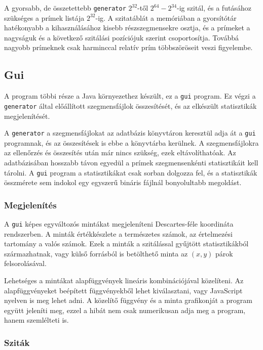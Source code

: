 A gyorsabb, de összetettebb \texttt{generator} $2^{32}$-től $2^{64}-2^{34}$-ig szitál,
és a futásához szükséges a prímek listája $2^{32}$-ig.
A szitatáblát a memóriában a gyorsítótár hatékonyabb a kihasználásához kisebb
részszegmensekre osztja, és a prímeket a nagyságuk és a következő szitálási pozíciójuk szerint csoportosítja.
Továbbá nagyobb prímeknek csak harminccal relatív prím többszöröseit veszi figyelembe.

\subsection{Gui}

A program többi része a Java környezethez készült, ez a \texttt{gui} program.
Ez végzi a \texttt{generator} által előállított szegmensfájlok összesítését, és az elkészült statisztikák megjelenítését.

A \texttt{generator} a szegmensfájlokat az adatbázis könyvtáron keresztül adja át a \texttt{gui} programnak, és az összesítések is ebbe a könyvtárba kerülnek.
A szegmensfájlokra az ellenőrzés és összesítés után már nincs szükség, ezek eltávolíthatóak.
Az adatbázisában hosszabb távon egyedül a prímek szegmensenkénti statisztikáit kell tárolni.
A \texttt{gui} program a statisztikákat csak sorban dolgozza fel, és a statisztikák összmérete sem indokol egy egyszerű bináris fájlnál bonyolultabb megoldást.

\subsubsection{Megjelenítés}

A \texttt{gui} képes egyváltozós mintákat megjeleníteni Descartes-féle koordináta rendszerben.
A minták értékkészlete a természetes számok, az értelmezési tartomány a valós számok.
Ezek a minták a szitálással gyűjtött statisztikákból származhatnak, vagy külső forrásból is betölthető minta az $(x, y)$ párok felsorolásával.

Lehetséges a mintákat alapfüggvények lineáris kombinációjával közelíteni.
Az alapfüggvényeket beépített függvényekből lehet kiválasztani, vagy JavaScript nyelven is meg lehet adni.
A közelítő függvény és a minta grafikonját a program együtt jeleníti meg, ezzel a hibát nem csak numerikusan adja meg a program, hanem szemlélteti is.

\subsubsection{Sziták}

